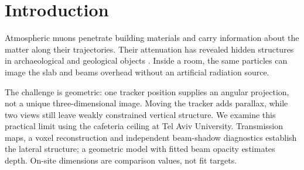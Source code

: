 \section{Introduction}\label{sec:intro}
Atmospheric muons penetrate building materials and carry information about the matter along their trajectories. Their attenuation has revealed hidden structures in archaeological and geological objects \citep{alvarez1970,morishima2017,procureur2018,bonechi2020}. Inside a room, the same particles can image the slab and beams overhead without an artificial radiation source.

The challenge is geometric: one tracker position supplies an angular projection, not a unique three-dimensional image. Moving the tracker adds parallax, while two views still leave weakly constrained vertical structure. We examine this practical limit using the cafeteria ceiling at Tel Aviv University. Transmission maps, a voxel reconstruction and independent beam-shadow diagnostics establish the lateral structure; a geometric model with fitted beam opacity estimates depth. On-site dimensions are comparison values, not fit targets.
